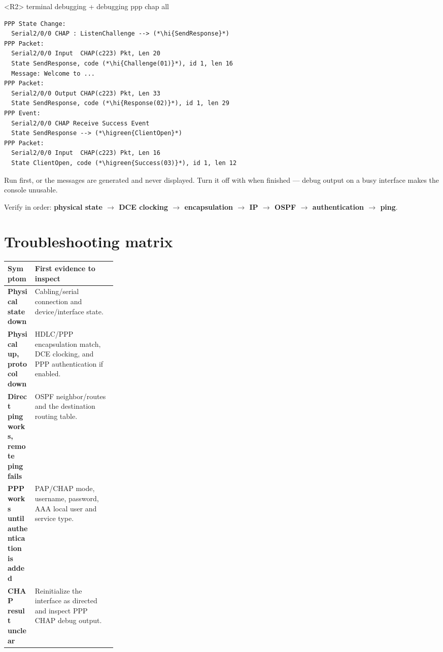\begin{vrpbox}{<R2> terminal debugging \quad + \quad debugging ppp chap all}
\begin{lstlisting}[style=dcnvrp]
PPP State Change:
  Serial2/0/0 CHAP : ListenChallenge --> (*\hi{SendResponse}*)
PPP Packet:
  Serial2/0/0 Input  CHAP(c223) Pkt, Len 20
  State SendResponse, code (*\hi{Challenge(01)}*), id 1, len 16
  Message: Welcome to ...
PPP Packet:
  Serial2/0/0 Output CHAP(c223) Pkt, Len 33
  State SendResponse, code (*\hi{Response(02)}*), id 1, len 29
PPP Event:
  Serial2/0/0 CHAP Receive Success Event
  State SendResponse --> (*\higreen{ClientOpen}*)
PPP Packet:
  Serial2/0/0 Input  CHAP(c223) Pkt, Len 16
  State ClientOpen, code (*\higreen{Success(03)}*), id 1, len 12
\end{lstlisting}
\end{vrpbox}

\begin{pitfall}
Run  first, or the messages are generated and never
displayed. Turn it off with  when finished ---
debug output on a busy interface makes the console unusable.
\end{pitfall}

\begin{verification}
Verify in order: \textbf{physical state $\rightarrow$ DCE clocking $\rightarrow$ encapsulation $\rightarrow$ IP $\rightarrow$ OSPF $\rightarrow$ authentication $\rightarrow$ ping}.
\end{verification}

\section{Troubleshooting matrix}
\begin{tabularx}{\linewidth}{>{\bfseries}p{0.25\linewidth}X}
\toprule
Symptom & First evidence to inspect\\\midrule
Physical state down & Cabling/serial connection and device/interface state.\\
Physical up, protocol down & HDLC/PPP encapsulation match, DCE clocking, and PPP authentication if enabled.\\
Direct ping works, remote ping fails & OSPF neighbor/routes and the destination routing table.\\
PPP works until authentication is added & PAP/CHAP mode, username, password, AAA local user and service type.\\
CHAP result unclear & Reinitialize the interface as directed and inspect PPP CHAP debug output.\\\bottomrule
\end{tabularx}

